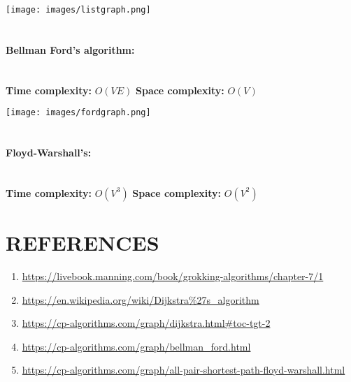 \documentclass[10pt]{article}
\begin{document}
\begin{multicols*}{2}
\texttt{[image: images/listgraph.png]}\\\\


\paragraph{Bellman Ford's algorithm:} \\
\textbf{Time complexity: } \(O(VE)\)
\textbf{Space complexity: } \(O(V)\)

\texttt{[image: images/fordgraph.png]}\\\\


\paragraph{Floyd-Warshall's:} \\
\textbf{Time complexity: } \(O(V^3)\)
\textbf{Space complexity: } \(O(V^2)\)



\section*{REFERENCES}

\begin{enumerate}
\item	\url{https://livebook.manning.com/book/grokking-algorithms/chapter-7/1}
\item	\url{https://en.wikipedia.org/wiki/Dijkstra%27s_algorithm}
\item	\url{https://cp-algorithms.com/graph/dijkstra.html#toc-tgt-2}
\item	\url{https://cp-algorithms.com/graph/bellman_ford.html}
\item	\url{https://cp-algorithms.com/graph/all-pair-shortest-path-floyd-warshall.html}

\end{enumerate}


\end{multicols*}
\clearpage

	
\end{document}
